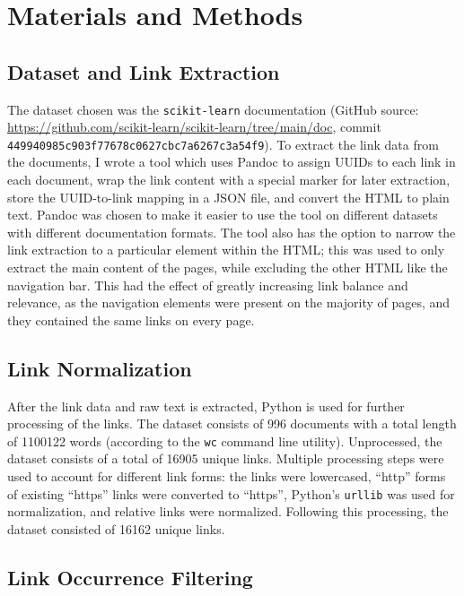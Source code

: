\documentclass[manuscript,screen,review]{acmart}
\begin{document}
\section*{Materials and Methods}
\label{sec:org52707f0}

\subsection*{Dataset and Link Extraction}
\label{sec:org083e034}
The dataset chosen was the \texttt{scikit-learn} documentation (GitHub source:
\url{https://github.com/scikit-learn/scikit-learn/tree/main/doc}, commit
\texttt{449940985c903f77678c0627cbc7a6267c3a54f9}). To extract the link data
from the documents, I wrote a tool which uses Pandoc
\citep{pandoc-homepage} to assign UUIDs to each link in each document,
wrap the link content with a special marker for later extraction,
store the UUID-to-link mapping in a JSON file, and convert the HTML to
plain text. Pandoc was chosen to make it easier to use the tool on
different datasets with different documentation formats. The tool also
has the option to narrow the link extraction to a particular element
within the HTML; this was used to only extract the main content of the
pages, while excluding the other HTML like the navigation bar. This
had the effect of greatly increasing link balance and relevance, as
the navigation elements were present on the majority of pages, and
they contained the same links on every page.

\subsection*{Link Normalization}
\label{sec:org84748c5}

After the link data and raw text is extracted, Python is used for
further processing of the links. The dataset consists of 996 documents
with a total length of 1100122 words (according to the \texttt{wc} command line
utility). Unprocessed, the dataset consists of a total of 16905 unique
links. Multiple processing steps were used to account for different
link forms: the links were lowercased, ``http'' forms of existing
``https'' links were converted to ``https'', Python's \texttt{urllib} was used for
normalization, and relative links were normalized. Following this
processing, the dataset consisted of 16162 unique links.

\subsection*{Link Occurrence Filtering}
\label{sec:org279658e}
\end{document}
